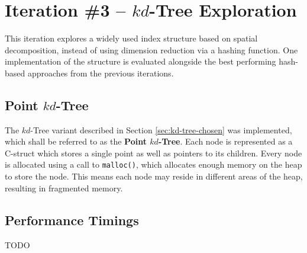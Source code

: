 \section{Iteration \#3 -- $kd$-Tree Exploration}

This iteration explores a widely used index structure based on spatial decomposition, instead of using dimension reduction via a hashing function. One implementation of the structure is evaluated alongside the best performing hash-based approaches from the previous iterations.

\subsection{Point $kd$-Tree}

The $kd$-Tree variant described in Section \ref{sec:kd-tree-chosen} was implemented, which shall be referred to as the \textbf{Point $kd$-Tree}. Each node is represented as a C-struct which stores a single point as well as pointers to its children. Every node is allocated using a call to \texttt{malloc()}, which allocates enough memory on the heap to store the node. This means each node may reside in different areas of the heap, resulting in fragmented memory.

\subsection{Performance Timings}

TODO

